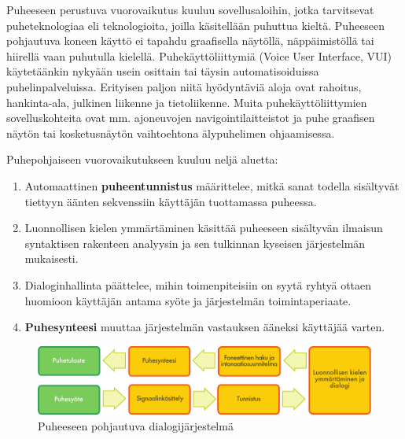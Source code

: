 \begin{multicols}{2}
Puheeseen perustuva vuorovaikutus kuuluu sovellusaloihin, jotka
tarvitsevat puheteknologiaa eli teknologioita, joilla käsitellään
puhuttua kieltä. Puheeseen pohjautuva koneen käyttö ei tapahdu
graafisella näytöllä, näppäimistöllä tai hiirellä vaan puhutulla
kielellä.
Puhekäyttöliittymiä (Voice User Interface, VUI) käytetäänkin nykyään usein osittain tai täysin
automatisoiduissa puhelinpalveluissa. Erityisen paljon niitä hyödyntäviä aloja ovat 
rahoitus, hankinta-ala, julkinen liikenne ja tietoliikenne. Muita
puhekäyttöliittymien sovelluskohteita ovat mm. ajoneuvojen
navigointilaitteistot ja puhe graafisen näytön tai kosketusnäytön
vaihtoehtona älypuhelimen ohjaamisessa.

Puhepohjaiseen vuorovaikutukseen kuuluu neljä aluetta:

\begin{enumerate}
\item Automaattinen \textbf{puheentunnistus} määrittelee, mitkä sanat
  todella sisältyvät tiettyyn äänten sekvenssiin käyttäjän tuottamassa
  puheessa.
\item Luonnollisen kielen ymmärtäminen käsittää puheeseen sisältyvän
  ilmaisun syntaktisen rakenteen analyysin ja sen tulkinnan kyseisen
  järjestelmän mukaisesti.
\item Dialoginhallinta päättelee, mihin toimenpiteisiin on syytä
  ryhtyä ottaen huomioon käyttäjän antama syöte ja järjestelmän
  toimintaperiaate.
\item \textbf{Puhesynteesi} muuttaa järjestelmän vastauksen ääneksi
  käyttäjää varten.
\end{enumerate}

\begin{figure}[htb]
  \center  \includegraphics[width=\textwidth]{../_media/finnish/simple_speech-based_dialogue_architecture}
  \center
    \caption{Puheeseen pohjautuva dialogijärjestelmä}
    \label{fig:dialoguearch-fin}
  \end{figure}


\end{multicols}
